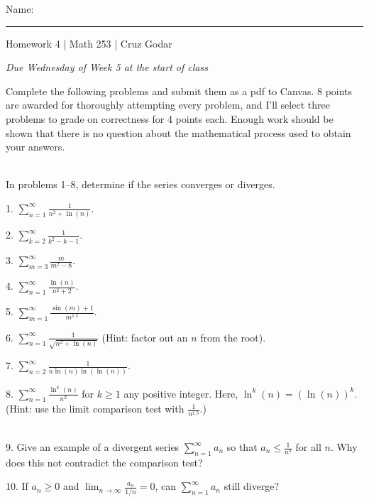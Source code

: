 \documentclass{article}
\begin{document}
\Large Name: \rule{2in}{0.15mm} \hfill Homework 4 | Math 253 | Cruz Godar \vspace{4pt} \normalsize

\textit{Due Wednesday of Week 5 at the start of class}

Complete the following problems and submit them as a pdf to Canvas. 8 points are awarded for thoroughly attempting every problem, and I'll select three problems to grade on correctness for 4 points each. Enough work should be shown that there is no question about the mathematical process used to obtain your answers.

~\\

In problems 1--8, determine if the series converges or diverges.

1. $\displaystyle \sum_{n = 1}^\infty \frac{1}{n^2 + \ln(n)}$.

2. $\displaystyle \sum_{k = 2}^\infty \frac{1}{k^2 - k - 1}$.

3. $\displaystyle \sum_{m = 3}^\infty \frac{m}{m^2 - 8}$.

4. $\displaystyle \sum_{n = 1}^\infty \frac{\ln(n)}{n^2 + 2}$.

5. $\displaystyle \sum_{m = 1}^\infty \frac{\sin(m) + 1}{m^{1.5}}$.

6. $\displaystyle \sum_{n = 1}^\infty \frac{1}{\sqrt{n^2 + \ln(n)}}$ (Hint: factor out an $n$ from the root).

7. $\displaystyle \sum_{n = 2}^\infty \frac{1}{n\ln(n)\ln(\ln(n))}$.

8. $\displaystyle \sum_{n = 1}^\infty \frac{\ln^k(n)}{n^2}$ for $k \geq 1$ any positive integer. Here, $\ln^k(n) = \left( \ln(n) \right)^k$. (Hint: use the limit comparison test with $\frac{1}{n^{1.5}}$.)

~\\

9. Give an example of a divergent series $\sum_{n = 1}^\infty a_n$ so that $a_n \leq \frac{1}{n^2}$ for all $n$. Why does this not contradict the comparison test?

10. If $a_n \geq 0$ and $\displaystyle \lim_{n \to \infty} \frac{a_n}{1/n} = 0$, can $\sum_{n = 1}^\infty a_n$ still diverge?
\end{document}
